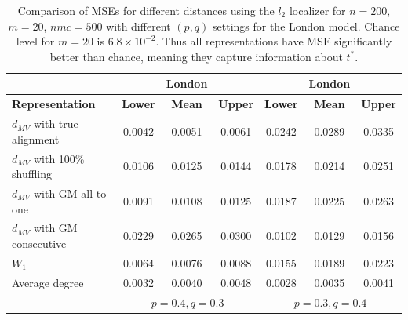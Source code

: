 \documentclass[12pt]{article}
\theoremstyle{definition}
\begin{document}
\begin{table}[htbp]
\centering
\begin{tabular}{lccc||ccc}
&&\textbf{London}&&&\textbf{London}&\\
\hline
\textbf{Representation} & \textbf{Lower} & \textbf{Mean} & \textbf{Upper} &\textbf{Lower} & \textbf{Mean} & \textbf{Upper} \\
\hline
$d_{MV}$ with true alignment  & 0.0042 & 0.0051 & 0.0061 & 0.0242 & 0.0289 & 0.0335 \\
$d_{MV}$ with 100\% shuffling    & 0.0106 & 0.0125 & 0.0144 & 0.0178 & 0.0214 & 0.0251 \\
$d_{MV}$ with GM all to one       & 0.0091 & 0.0108 & 0.0125 & 0.0187 & 0.0225 & 0.0263 \\
$d_{MV}$ with GM consecutive      & 0.0229 & 0.0265 & 0.0300 & 0.0102 & 0.0129 & 0.0156 \\
$W_1$ 
& 0.0064 & 0.0076 & 0.0088 & 0.0155 & 0.0189 & 0.0223 \\
Average degree
& 0.0032 & 0.0040 & 0.0048 & 0.0028 & 0.0035 & 0.0041 \\
\hline
&\multicolumn{3}{c}{$p=0.4,q=0.3$}&\multicolumn{3}{c}{$p=0.3,q=0.4$}
\end{tabular}
\caption{Comparison of MSEs for different distances using the $l_2$ localizer for $n = 200$, $m = 20$, $nmc = 500$ with different $(p, q)$ settings for the London model. Chance level for $m=20$ is $6.8\times 10^{-2}$. Thus all representations have MSE significantly better than chance, meaning they capture information about $t^*$.}
\label{tab:L}
\end{table}
\end{document}
